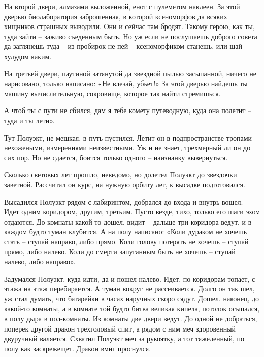 \documentclass[ebook,oneside,final,openright]{memoir}
\begin{document}
\par
На второй двери, алмазами выложенной, енот с пулеметом наклеен. За этой дверью биолаборатория заброшенная, в которой ксеноморфов да всяких хищников страшных выводили. Они и сейчас там бродят. Такому герою, как ты, туда зайти – заживо съеденным быть. Но уж если не послушаешь доброго совета да заглянешь туда – из пробирок не пей – ксеноморфиком станешь, или шай-хулудом каким.\par
\par
На третьей двери, паутиной затянутой да звездной пылью засыпанной, ничего не нарисовано, только написано: «Не влезай, убьет!» За этой дверью найдешь ты машину вычислительную, сокровище, которое так найти стремишься.\par
\par
А чтоб ты с пути не сбился, дам я тебе комету путеводную, куда она полетит – туда и ты лети».\par
\par
Тут Полуэкт, не мешкая, в путь пустился. Летит он в подпространстве тропами нехожеными, измерениями неизвестными. Уж и не знает, трехмерный ли он до сих пор. Но не сдается, боится только одного – наизнанку вывернуться.\par
\par
Сколько световых лет прошло, неведомо, но долетел Полуэкт до звездочки заветной. Рассчитал он курс, на нужную орбиту лег, к высадке подготовился.\par
\par
Высадился Полуэкт рядом с лабиринтом, добрался до входа и внутрь вошел. Идет одним коридором, другим, третьим. Пусто везде, тихо, только его шаги эхом отдаются. До комнаты какой-то дошел, видит – дальше три коридора ведут, и в каждом будто туман клубится. А на полу написано: «Коли дураком не хочешь стать – ступай направо, либо прямо. Коли голову потерять не хочешь – ступай прямо, либо налево. Коли до смерти запуганным быть не хочешь – ступай налево, либо направо».\par
\par
Задумался Полуэкт, куда идти, да и пошел налево. Идет, по коридорам топает, с этажа на этаж перебирается. А туман вокруг не рассеивается. Долго он так шел, уж стал думать, что батарейки в часах наручных скоро сядут. Дошел, наконец, до какой-то комнаты, а в комнате той будто битва великая кипела, потолок осыпался, в полу дыра в пол-комнаты. Из комнаты две двери ведут. До одной не добраться, поперек другой дракон трехголовый спит, а рядом с ним меч здоровенный двуручный валяется. Схватил Полуэкт меч за рукоятку, а тот тяжеленный, по полу как заскрежещет. Дракон вмиг проснулся.\par
\end{document}

